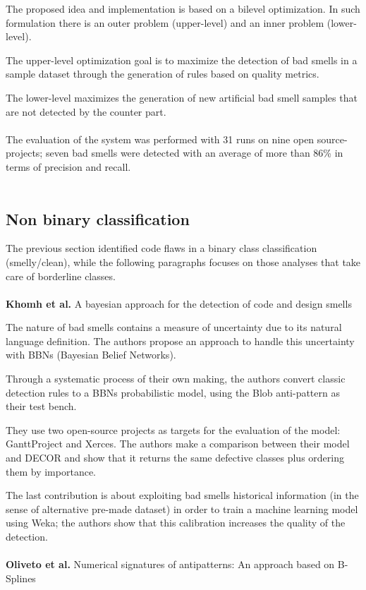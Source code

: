 The proposed idea and implementation is based on a bilevel optimization. In such formulation there is an outer problem (upper-level) and an inner problem (lower-level).

The upper-level optimization goal is to maximize the detection of bad smells in a sample dataset through the generation of rules based on quality metrics. 

The lower-level maximizes the generation of new artificial bad smell samples that are not detected by the counter part.
\\
\\
The evaluation of the system was performed with 31 runs on nine open source-projects; seven bad smells were detected with an average of more than 86\% in terms of precision and recall.
\\
\\
\subsection{Non binary classification}
The previous section identified code flaws in a binary class classification (smelly/clean), while the following paragraphs focuses on those analyses that take care of borderline classes.
\\
\\
\textbf{Khomh et al.} \cite{khomh2009bayesian} A bayesian approach for the detection of code and design smells
 
The nature of bad smells contains a measure of uncertainty due to its natural language definition. The authors propose an approach to handle this uncertainty with BBNs (Bayesian Belief Networks). 

Through a systematic process of their own making, the authors convert classic detection rules to a BBNs probabilistic model, using the Blob anti-pattern as their test bench.

They use two open-source projects as targets for the evaluation of the model: GanttProject and Xerces. The authors make a comparison between their model and DECOR and show that it returns the same defective classes plus ordering them by importance.

The last contribution is about exploiting bad smells historical information (in the sense of alternative pre-made dataset) in order to train a machine learning model using Weka; the authors show that this calibration increases the quality of the detection.
\\
\\
\textbf{Oliveto et al.} \cite{oliveto2010numerical} Numerical signatures of antipatterns: An approach based on B-Splines


